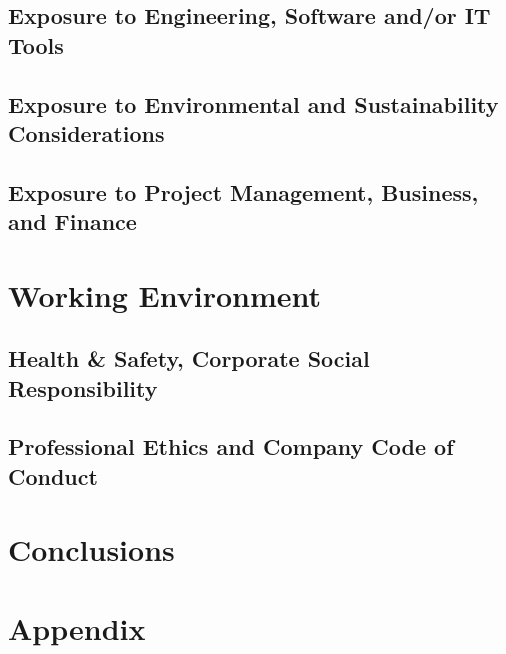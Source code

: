 \documentclass[12pt]{article}
\begin{document}
\subsection{Exposure to Engineering, Software and/or IT Tools}
\subsection{Exposure to Environmental and Sustainability Considerations}
\subsection{Exposure to Project Management, Business, and Finance}

\clearpage

\section{Working Environment}
\subsection{Health \& Safety, Corporate Social Responsibility}
\subsection{Professional Ethics and Company Code of Conduct}

\clearpage

\section{Conclusions}

\clearpage

\printbibliography
{}

\clearpage

\section*{Appendix}
\end{document}
